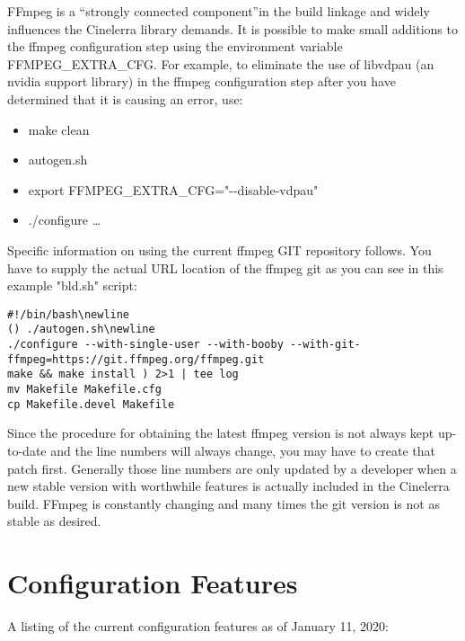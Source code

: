 FFmpeg is a ``strongly connected component''in the build linkage and widely influences the Cinelerra library demands.  It is possible to make small additions to the ffmpeg configuration step using the environment variable FFMPEG\_EXTRA\_CFG.  For example, to eliminate the use of libvdpau (an nvidia support library) in the ffmpeg configuration step after you have determined that it is causing an error, use:

\begin{itemize}[label={},nosep]
	\item make clean
	\item autogen.sh
	\item export FFMPEG\_EXTRA\_CFG="-{}-disable-vdpau" 
	\item ./configure {\dots}
\end{itemize}
\medskip

Specific information on using the current ffmpeg GIT repository follows.  You have to supply the actual URL location of the ffmpeg git as you can see in this example "bld.sh" script:
\medskip

\begin{lstlisting}[numbers=none]
#!/bin/bash\newline
() ./autogen.sh\newline
./configure --with-single-user --with-booby --with-git-ffmpeg=https://git.ffmpeg.org/ffmpeg.git
make && make install ) 2>1 | tee log
mv Makefile Makefile.cfg
cp Makefile.devel Makefile
\end{lstlisting}

Since the procedure for obtaining the latest ffmpeg version is not always kept up-to-date and the line numbers will always change, you may have to create that patch first. Generally those line numbers are only updated by a developer when a new stable version with worthwhile features is actually included in the Cinelerra build. FFmpeg is constantly changing and many times the git version is not as stable as desired.

\section{Configuration Features}
\label{sec:Configuration Features}

A listing of the current configuration features as of January 11, 2020:

